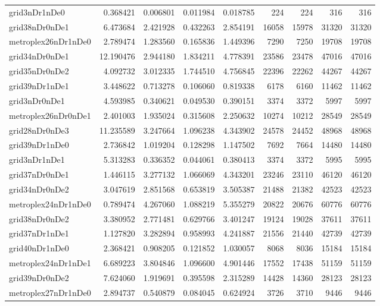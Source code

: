 \begin{longtable}{|l|r|r|r|r|r|r|r|r|}
grid3nDr1nDe0 & 0.368421 & 0.006801 & 0.011984 & 0.018785 & 224 & 224 & 316 & 316 \\
grid38nDr0nDe1 & 6.473684 & 2.421928 & 0.432263 & 2.854191 & 16058 & 15978 & 31320 & 31320 \\
metroplex26nDr1nDe0 & 2.789474 & 1.283560 & 0.165836 & 1.449396 & 7290 & 7250 & 19708 & 19708 \\
grid34nDr0nDe1 & 12.190476 & 2.944180 & 1.834211 & 4.778391 & 23586 & 23478 & 47016 & 47016 \\
grid35nDr0nDe2 & 4.092732 & 3.012335 & 1.744510 & 4.756845 & 22396 & 22262 & 44267 & 44267 \\
grid39nDr1nDe1 & 3.448622 & 0.713278 & 0.106060 & 0.819338 & 6178 & 6160 & 11462 & 11462 \\
grid3nDr0nDe1 & 4.593985 & 0.340621 & 0.049530 & 0.390151 & 3374 & 3372 & 5997 & 5997 \\
metroplex26nDr0nDe1 & 2.401003 & 1.935024 & 0.315608 & 2.250632 & 10274 & 10212 & 28549 & 28549 \\
grid28nDr0nDe3 & 11.235589 & 3.247664 & 1.096238 & 4.343902 & 24578 & 24452 & 48968 & 48968 \\
grid39nDr1nDe0 & 2.736842 & 1.019204 & 0.128298 & 1.147502 & 7692 & 7664 & 14480 & 14480 \\
grid3nDr1nDe1 & 5.313283 & 0.336352 & 0.044061 & 0.380413 & 3374 & 3372 & 5995 & 5995 \\
grid37nDr0nDe1 & 1.446115 & 3.277132 & 1.066069 & 4.343201 & 23246 & 23110 & 46120 & 46120 \\
grid34nDr0nDe2 & 3.047619 & 2.851568 & 0.653819 & 3.505387 & 21488 & 21382 & 42523 & 42523 \\
metroplex24nDr1nDe0 & 0.789474 & 4.267060 & 1.088219 & 5.355279 & 20822 & 20676 & 60776 & 60776 \\
grid38nDr0nDe2 & 3.380952 & 2.771481 & 0.629766 & 3.401247 & 19124 & 19028 & 37611 & 37611 \\
grid37nDr1nDe1 & 1.127820 & 3.282894 & 0.958993 & 4.241887 & 21556 & 21440 & 42739 & 42739 \\
grid40nDr1nDe0 & 2.368421 & 0.908205 & 0.121852 & 1.030057 & 8068 & 8036 & 15184 & 15184 \\
metroplex24nDr1nDe1 & 6.689223 & 3.804846 & 1.096600 & 4.901446 & 17552 & 17438 & 51159 & 51159 \\
grid39nDr0nDe2 & 7.624060 & 1.919691 & 0.395598 & 2.315289 & 14428 & 14360 & 28123 & 28123 \\
metroplex27nDr1nDe0 & 2.894737 & 0.540879 & 0.084045 & 0.624924 & 3726 & 3710 & 9446 & 9446 \\

\end{longtable}
